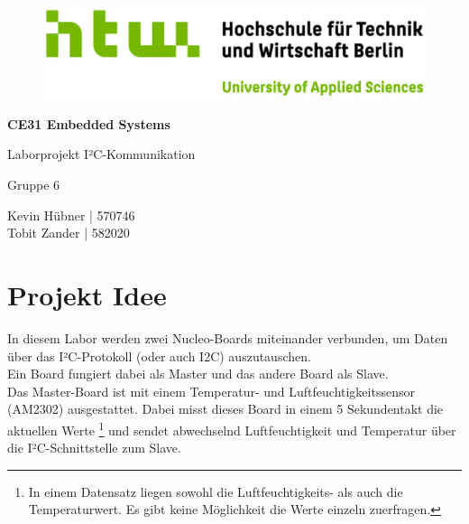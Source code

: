 \documentclass[11pt,a4paper,titlepage]{article}
\begin{document}
\begin{titlepage}
    \centering




    \begin{figure}
        \centering
        \includegraphics[scale=1]{htw-berlin_logo.jpg}
    \end{figure}



    {\LARGE\bfseries CE31 Embedded Systems}


    \vspace{2cm}

    {\Large Laborprojekt I²C-Kommunikation}

    Gruppe 6

    \vspace{1cm}

    {\large Kevin Hübner | 570746}\\
    {\large Tobit Zander | 582020}

    \vspace{0.1cm}





\end{titlepage}

\newpage
\tableofcontents
\listoffigures
\listoftables
\lstlistoflistings
\newpage

\section{Projekt Idee}
In diesem Labor werden zwei Nucleo-Boards miteinander verbunden,
um Daten über das I²C-Protokoll (oder auch I2C) auszutauschen.\\
Ein Board fungiert dabei als Master und das andere Board als Slave.\\

Das Master-Board ist mit einem Temperatur- und Luftfeuchtigkeitssensor (AM2302) ausgestattet.
Dabei misst dieses Board in einem 5 Sekundentakt die aktuellen Werte
\footnote{In einem Datensatz liegen sowohl die Luftfeuchtigkeits- als auch die Temperaturwert. Es gibt keine Möglichkeit die Werte einzeln zuerfragen.}
und sendet abwechselnd Luftfeuchtigkeit und Temperatur über die I²C-Schnittstelle zum Slave.\\
\end{document}
